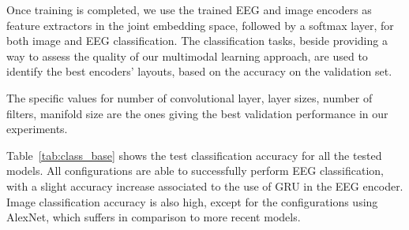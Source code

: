 \documentclass[10pt,journal,compsoc,twocolumn]{IEEEtran}
\begin{document}
Once training is completed, we use the trained EEG and image encoders as feature extractors in the joint embedding space, followed by a softmax layer, for both image and EEG classification. The classification tasks, beside providing a way to assess the quality of our multimodal learning approach, are used to identify the best encoders' layouts, based on the accuracy on the validation set. 

The specific values for number of convolutional layer, layer sizes, number of filters, manifold size are the ones giving the best validation performance in our experiments.

Table~\ref{tab:class_base} shows the test classification accuracy for all the tested models. All configurations are able to successfully perform EEG classification, with a slight accuracy increase associated to the use of GRU in the EEG encoder. Image classification accuracy is also high, except for the configurations using AlexNet, which suffers in comparison to more recent models.
\end{document}
